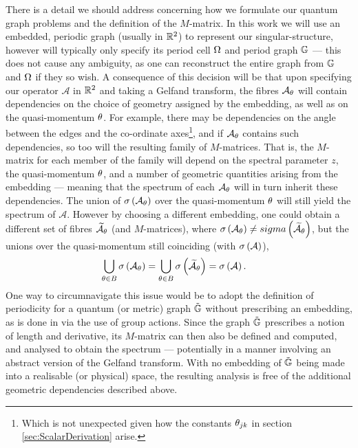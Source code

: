 There is a detail we should address concerning how we formulate our quantum graph problems and the definition of the $M$-matrix.
In this work we will use an embedded, periodic graph (usually in $\mathbb{R}^2$) to represent our singular-structure, however will typically only specify its period cell $\Omega$ and period graph $\mathbb{G}$ --- this does not cause any ambiguity, as one can reconstruct the entire graph from $\mathbb{G}$ and $\Omega$ if they so wish.
A consequence of this decision will be that upon specifying our operator $\mathcal{A}$ in $\mathbb{R}^2$ and taking a Gelfand transform, the fibres $\mathcal{A}_{\theta}$ will contain dependencies on the choice of geometry assigned by the embedding, as well as on the quasi-momentum $\theta$.
For example, there may be dependencies on the angle between the edges and the co-ordinate axes\footnote{Which is not unexpected given how the constants $\theta_{jk}$ in section \ref{sec:ScalarDerivation} arise.}, and if $\mathcal{A}_{\theta}$ contains such dependencies, so too will the resulting family of $M$-matrices.
That is, the $M$-matrix for each member of the family will depend on the spectral parameter $z$, the quasi-momentum $\theta$, and a number of geometric quantities arising from the embedding --- meaning that the spectrum of each $\mathcal{A}_{\theta}$ will in turn inherit these dependencies.
The union of $\sigma\left( \mathcal{A}_{\theta} \right)$ over the quasi-momentum $\theta$ will still yield the spectrum of $\mathcal{A}$.
However by choosing a different embedding, one could obtain a different set of fibres $\widetilde{\mathcal{A}}_{\theta}$ (and $M$-matrices), where $\sigma\left( \mathcal{A}_{\theta} \right) \neq sigma\left( \widetilde{\mathcal{A}}_{\theta} \right)$, but the unions over the quasi-momentum still coinciding (with $\sigma\left( \mathcal{A} \right)$),
\begin{align*}
	\bigcup_{\theta\in B} \sigma\left( \mathcal{A}_{\theta} \right) &= \bigcup_{\theta\in B} \sigma\left( \widetilde{\mathcal{A}}_{\theta} \right) = \sigma\left( \mathcal{A} \right).
\end{align*}
One way to circumnavigate this issue would be to adopt the definition of periodicity for a quantum (or metric) graph $\tilde{\mathbb{G}}$ without prescribing an embedding, as is done in \cite[chapter 4]{berkolaiko2013introduction} via the use of group actions.
Since the graph $\tilde{\mathbb{G}}$ prescribes a notion of length and derivative, its $M$-matrix can then also be defined and computed, and analysed to obtain the spectrum --- potentially in a manner involving an abstract version of the Gelfand transform.
With no embedding of $\tilde{\mathbb{G}}$ being made into a realisable (or physical) space, the resulting analysis is free of the additional geometric dependencies described above.
